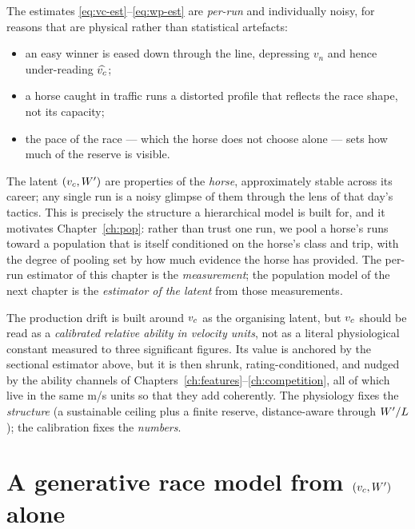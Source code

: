 The estimates \eqref{eq:vc-est}--\eqref{eq:wp-est} are \emph{per-run} and individually noisy, for
reasons that are physical rather than statistical artefacts:
\begin{itemize}
  \item an easy winner is eased down through the line, depressing $v_{n}$ and hence under-reading
        $\widehat{{v_{c}}}$;
  \item a horse caught in traffic runs a distorted profile that reflects the race shape, not its
        capacity;
  \item the pace of the race --- which the horse does not choose alone --- sets how much of the
        reserve is visible.
\end{itemize}
The latent $({v_{c}},{W^{\prime}})$ are properties of the \emph{horse}, approximately stable across its
career; any single run is a noisy glimpse of them through the lens of that day's tactics. This is
precisely the structure a hierarchical model is built for, and it motivates
Chapter~\ref{ch:pop}: rather than trust one run, we pool a horse's runs toward a population that
is itself conditioned on the horse's class and trip, with the degree of pooling set by how much
evidence the horse has provided. The per-run estimator of this chapter is the \emph{measurement};
the population model of the next chapter is the \emph{estimator of the latent} from those
measurements.

\begin{remark}
The production drift is built around ${v_{c}}$ as the organising latent, but ${v_{c}}$ should be read as
a \emph{calibrated relative ability in velocity units}, not as a literal physiological constant
measured to three significant figures. Its value is anchored by the sectional estimator above, but
it is then shrunk, rating-conditioned, and nudged by the ability channels of
Chapters~\ref{ch:features}--\ref{ch:competition}, all of which live in the same m/s units so that
they add coherently. The physiology fixes the \emph{structure} (a sustainable ceiling plus a
finite reserve, distance-aware through ${W^{\prime}}/L$); the calibration fixes the \emph{numbers}.
\end{remark}

\section{A generative race model from $({v_{c}},{W^{\prime}})$ alone}

